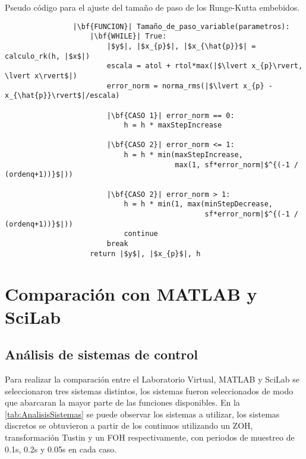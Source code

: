         \begin{longlisting}
            \caption[Pseudo código - Runge-Kutta embebidos]{Pseudo código para el ajuste del tamaño de paso de los Runge-Kutta embebidos.}
            \label{code:stepembebido}				
            \begin{verbatim}
                |\bf{FUNCION}| Tamaño_de_paso_variable(parametros):
                    |\bf{WHILE}| True:
                        |$y$|, |$x_{p}$|, |$x_{\hat{p}}$| = calculo_rk(h, |$x$|)
                        escala = atol + rtol*max(|$\lvert x_{p}\rvert, \lvert x\rvert$|)
                        error_norm = norma_rms(|$\lvert x_{p} - x_{\hat{p}}\rvert$|/escala)
                        
                        |\bf{CASO 1}| error_norm == 0:
                            h = h * maxStepIncrease
                        
                        |\bf{CASO 2}| error_norm <= 1:
                            h = h * min(maxStepIncrease,
                                        max(1, sf*error_norm|$^{(-1 / (ordenq+1))}$|))
                        
                        |\bf{CASO 2}| error_norm > 1:
                            h = h * min(1, max(minStepDecrease, 
                                               sf*error_norm|$^{(-1 / (ordenq+1))}$|))
                            continue
                        break
                    return |$y$|, |$x_{p}$|, h
            \end{verbatim}
        \end{longlisting}

\section{Comparación con MATLAB y SciLab}

    \subsection{Análisis de sistemas de control}
        
        Para realizar la comparación entre el Laboratorio Virtual, MATLAB y SciLab se seleccionaron tres sistemas distintos, los sistemas fueron seleccionados de modo que abarcaran la mayor parte de las funciones disponibles. En la \cref{tab:AnalisisSistemas} se puede observar los sistemas a utilizar, los sistemas discretos se obtuvieron a partir de los continuos utilizando un ZOH, transformación Tustin y un FOH respectivamente, con periodos de muestreo de 0.1s, 0.2s y 0.05s en cada caso.    

